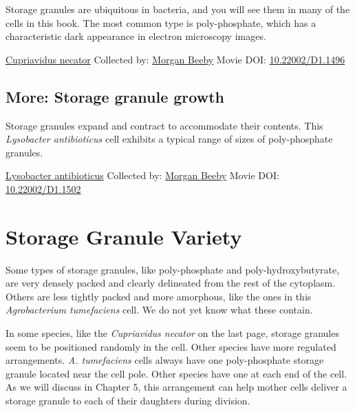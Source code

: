 \documentclass[]{tufte-book}
\begin{document}
Storage granules are ubiquitous in bacteria, and you will see them in many of the cells in this book. The most common type is poly-phosphate, which has a characteristic dark appearance in electron microscopy images.



\hypertarget{htmlwidget-d665382441c49030126d}{}

\label{fig:4-8}\protect\hyperlink{tree}{Cupriavidus necator} Collected by: \protect\hyperlink{morgan_beeby}{Morgan Beeby} Movie DOI: \href{https://doi.org/10.22002/D1.1496}{10.22002/D1.1496}

\hypertarget{Storage_granule_growth}{%
\subsection*{More: Storage granule growth}\label{Storage_granule_growth}}

Storage granules expand and contract to accommodate their contents. This \emph{Lysobacter antibioticus} cell exhibits a typical range of sizes of poly-phosphate granules.



\hypertarget{htmlwidget-7571fe600cab52e549e6}{}

\label{fig:4-8a}\protect\hyperlink{tree}{Lysobacter antibioticus} Collected by: \protect\hyperlink{morgan_beeby}{Morgan Beeby} Movie DOI: \href{https://doi.org/10.22002/D1.1502}{10.22002/D1.1502}

\hypertarget{storage-granule-variety}{%
\section{Storage Granule Variety}\label{storage-granule-variety}}

Some types of storage granules, like poly-phosphate and poly-hydroxybutyrate, are very densely packed and clearly delineated from the rest of the cytoplasm. Others are less tightly packed and more amorphous, like the ones in this \emph{Agrobacterium tumefaciens} cell. We do not yet know what these contain.

In some species, like the \emph{Cupriavidus necator} on the last page, storage granules seem to be positioned randomly in the cell. Other species have more regulated arrangements. \emph{A. tumefaciens} cells always have one poly-phosphate storage granule located near the cell pole. Other species have one at each end of the cell. As we will discuss in Chapter 5, this arrangement can help mother cells deliver a storage granule to each of their daughters during division.
\end{document}
